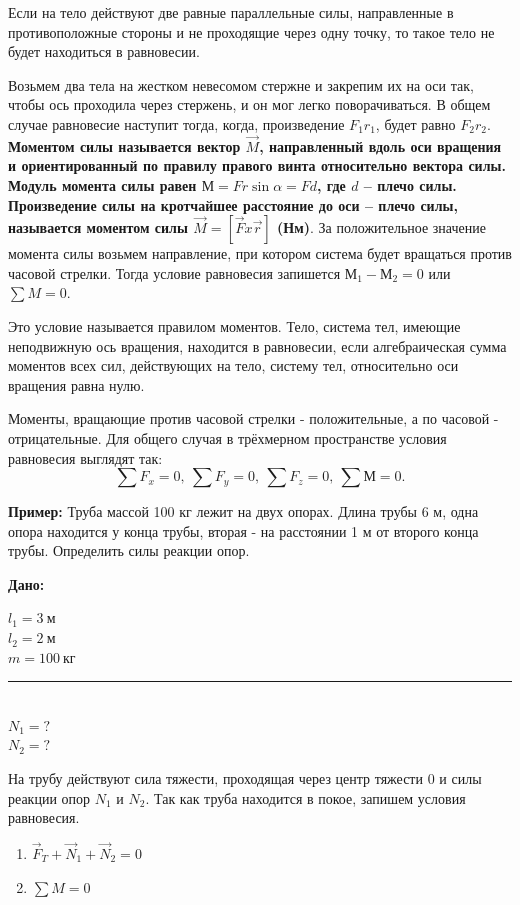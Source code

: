 \documentclass[a5paper, 10pt]{diss_4}
\renewcommand{\'}{\,'}
\begin{document}
 Если на тело действуют две равные параллельные силы, направленные в
противоположные стороны и не проходящие через одну точку, то такое тело не
будет находиться в равновесии.

Возьмем два тела на жестком невесомом стержне и закрепим их на оси так, чтобы ось
проходила через стержень, и он мог легко поворачиваться. В общем случае равновесие
наступит тогда, когда, произведение $F_1r_1$, будет равно $F_2r_2$. \textbf{ Моментом
силы  называется вектор $\vec{M}$, направленный вдоль оси вращения и ориентированный по
правилу правого винта относительно вектора силы. Модуль момента силы равен
$М=Fr\sin\alpha=Fd$, где $d$ -- плечо силы. Произведение силы на кротчайшее расстояние до
оси -- плечо силы, называется моментом силы $\vec{M}=\left[\vec{F}x\vec{r}\right]$ (Нм)}.
За положительное значение момента силы возьмем направление, при котором система будет
вращаться против часовой стрелки. Тогда условие равновесия запишется  $М_1-М_2=0$    или
$\sum M=0$.

 Это условие называется правилом моментов. Тело, система тел, имеющие
неподвижную ось вращения, находится в равновесии, если алгебраическая сумма
моментов всех сил, действующих на тело, систему тел, относительно оси вращения
равна нулю.

Моменты, вращающие против часовой стрелки - положительные, а по часовой - отрицательные.
Для общего случая в трёхмерном пространстве условия равновесия выглядят так:
\[
\sum F_x=0,\   \sum F_y=0,\  \sum F_z=0,\  \sum М=0.
\]


 \textbf{Пример:} Труба массой 100 кг лежит на двух опорах. Длина трубы 6 м, одна
опора находится у конца трубы, вторая - на расстоянии 1 м от второго конца
трубы. Определить силы реакции опор.

\hspace{1cm}\textbf{Дано:}\hspace{.3cm}
\parbox[t]{4cm}{
$l_1 =3\ м$\\
$l_2 =2\ м$\\
$m=100\ кг$\\
\rule{4cm}{.4pt}\\
$N_1 = ?$\\
$N_2 = ?$\\
}

На трубу действуют сила тяжести, проходящая через центр тяжести $0$ и силы реакции опор $N_1$ и $N_2$. Так как труба находится в покое, запишем условия равновесия.

\begin{enumerate}
  \item {$\vec{F}_T+\vec{N}_1+\vec{N}_2=0$}
  \item {$\sum M=0$}
\end{enumerate}
\end{document}

